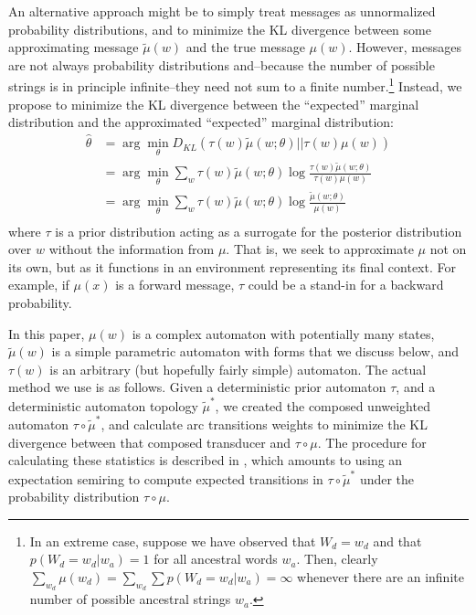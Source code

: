 \documentclass[11pt,a4paper]{article}
\begin{document}
An alternative approach might be to simply treat messages as
unnormalized probability distributions, and to minimize the KL
divergence between some approximating message $\tilde\mu(w)$ and
the true message $\mu(w)$.  However, messages are not always
probability distributions and--because the number of possible
strings is in principle infinite--they need not sum to a finite
number.\footnote{In an extreme case, suppose we have observed that
$W_d=w_d$ and that $p(W_d=w_d|w_a)=1$ for all ancestral words $w_a$.
Then, clearly $\sum_{w_d} \mu(w_d) = \sum_{w_d} \sum p(W_d=w_d|w_a)
= \infty$ whenever there are an infinite number of possible ancestral
strings $w_a$.} Instead, we propose to minimize the KL divergence
between the ``expected'' marginal distribution and the approximated
``expected'' marginal distribution:
\begin{equation}
  \begin{split}
    \hat\theta &= \arg\!\min_{\theta} D_{KL}(\tau(w)\tilde\mu(w;\theta)||\tau(w)\mu(w) ) \\
    &= \arg\!\min_{\theta} \sum_w \tau(w) \tilde\mu(w;\theta) \log \frac{\tau(w)\tilde\mu(w;\theta)}{\tau(w)\mu(w)} \\
    &= \arg\!\min_{\theta} \sum_w \tau(w) \tilde\mu(w;\theta) \log \frac{\tilde\mu(w;\theta)}{\mu(w)} \\
   \end{split}
 \end{equation}
where $\tau$ is a prior distribution acting as a surrogate for the
posterior distribution over $w$ without the information from $\mu$.
That is, we seek to approximate $\mu$ not on its own, but as it
functions in an environment representing its final context. For
example, if $\mu(x)$ is a forward message, $\tau$ could be a stand-in
for a backward probability.

In this paper, $\mu(w)$ is a complex automaton with potentially
many states, $\tilde\mu(w)$ is a simple parametric automaton with
forms that we discuss below, and $\tau(w)$ is an arbitrary (but
hopefully fairly simple) automaton. The actual method we use is as
follows. Given a deterministic prior automaton $\tau$, and a
deterministic automaton topology $\tilde\mu^*$, we created the
composed unweighted automaton $\tau \circ \tilde\mu^*$, and calculate
arc transitions weights to minimize the KL divergence between that
composed transducer and $\tau\circ\mu$. The procedure for calculating
these statistics is described in , which
amounts to using an expectation semiring \cite{eisner2001expectation}
to compute expected transitions in $\tau\circ\tilde\mu^*$ under the
probability distribution $\tau\circ\mu$.
\end{document}
